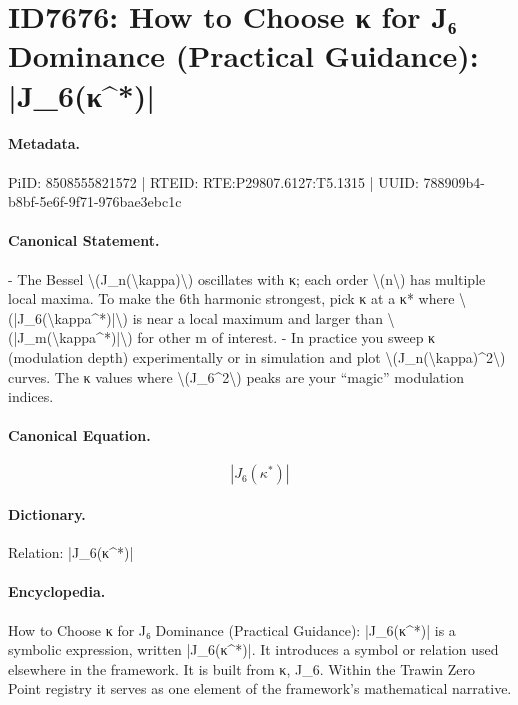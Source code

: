\section*{ID7676: How to Choose κ for J₆ Dominance (Practical Guidance): |J\_6(κ\textasciicircum{}*)|}
\paragraph{Metadata.}
PiID: 8508555821572 | RTEID: RTE:P29807.6127:T5.1315 | UUID: 788909b4-b8bf-5e6f-9f71-976bae3ebc1c

\paragraph{Canonical Statement.}
- The Bessel \textbackslash{}(J\_n(\textbackslash{}kappa)\textbackslash{}) oscillates with κ; each order \textbackslash{}(n\textbackslash{}) has multiple local maxima. To make the 6th harmonic strongest, pick κ at a κ* where \textbackslash{}(|J\_6(\textbackslash{}kappa\textasciicircum{}*)|\textbackslash{}) is near a local maximum and larger than \textbackslash{}(|J\_m(\textbackslash{}kappa\textasciicircum{}*)|\textbackslash{}) for other m of interest. - In practice you sweep κ (modulation depth) experimentally or in simulation and plot \textbackslash{}(J\_n(\textbackslash{}kappa)\textasciicircum{}2\textbackslash{}) curves. The κ values where \textbackslash{}(J\_6\textasciicircum{}2\textbackslash{}) peaks are your “magic” modulation indices.

\paragraph{Canonical Equation.}
\[
|J_6(\kappa^*)|
\]

\paragraph{Dictionary.}
Relation: |J\_6(κ\textasciicircum{}*)|

\paragraph{Encyclopedia.}
How to Choose κ for J₆ Dominance (Practical Guidance): |J\_6(κ\textasciicircum{}*)| is a symbolic expression, written |J\_6(κ\textasciicircum{}*)|. It introduces a symbol or relation used elsewhere in the framework. It is built from κ, J\_6. Within the Trawin Zero Point registry it serves as one element of the framework's mathematical narrative.
